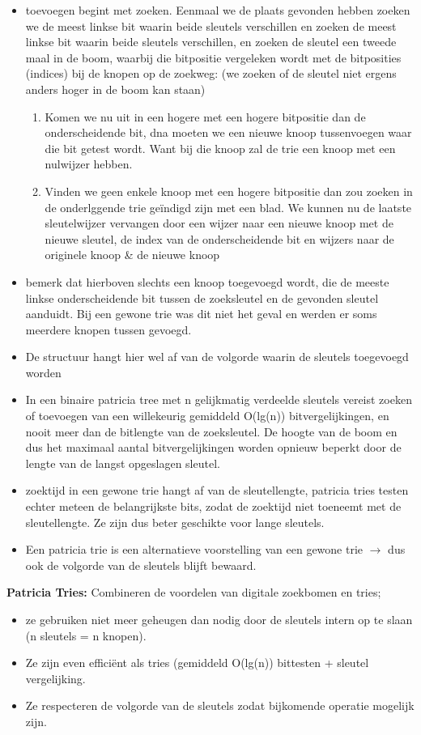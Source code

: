 \begin{itemize}
\item toevoegen begint met zoeken. Eenmaal we de plaats gevonden hebben zoeken we de meest linkse bit waarin beide sleutels verschillen en zoeken de meest linkse bit waarin beide sleutels verschillen, en zoeken de sleutel een tweede maal in de boom, waarbij die bitpositie vergeleken wordt met de bitposities (indices) bij de knopen op de zoekweg: (we zoeken of de sleutel niet ergens anders hoger in de boom kan staan)
\begin{enumerate}
\item Komen we nu uit in een hogere met een hogere bitpositie dan de onderscheidende bit, dna moeten we een nieuwe knoop tussenvoegen waar die bit getest wordt.  Want bij die knoop zal de trie een knoop met een nulwijzer hebben.
\item Vinden we geen enkele knoop met een hogere bitpositie dan zou zoeken in de onderlggende trie ge\"indigd zijn met een blad. We kunnen nu de laatste sleutelwijzer vervangen door een wijzer  naar een nieuwe knoop met de nieuwe sleutel, de index van de onderscheidende bit en wijzers naar de originele knoop \& de nieuwe knoop
\end{enumerate}
\item bemerk dat hierboven slechts een knoop toegevoegd wordt, die de meeste linkse onderscheidende bit tussen de zoeksleutel en de gevonden sleutel aanduidt. Bij een gewone trie was dit niet het geval en werden er soms meerdere knopen tussen gevoegd.
\item De structuur hangt hier wel af van de volgorde waarin de sleutels toegevoegd worden
\item In een binaire patricia tree met n gelijkmatig verdeelde sleutels vereist zoeken of toevoegen van een willekeurig gemiddeld O(lg(n)) bitvergelijkingen, en nooit meer dan de bitlengte van de zoeksleutel. De hoogte van de boom en dus het maximaal aantal bitvergelijkingen worden opnieuw beperkt door de lengte van de langst opgeslagen sleutel.
\item zoektijd in een gewone trie hangt af van de sleutellengte, patricia tries testen echter meteen de belangrijkste bits, zodat de zoektijd niet toeneemt met de sleutellengte. Ze zijn dus beter geschikte voor lange sleutels.
\item Een patricia trie is een alternatieve voorstelling van een gewone trie $\rightarrow$ dus ook de volgorde van de sleutels blijft bewaard.
\end{itemize}

\begin{mdframed}[leftmargin=10pt,rightmargin=10pt]
\textbf{Patricia Tries:} Combineren de voordelen van digitale zoekbomen en tries; 
\begin{itemize}
\item ze gebruiken niet meer geheugen dan nodig door de sleutels intern op te slaan (n sleutels = n knopen). 
\item Ze zijn even effici\"ent als tries (gemiddeld O(lg(n)) bittesten + sleutel vergelijking. 
\item Ze respecteren de volgorde van de sleutels zodat bijkomende operatie mogelijk zijn.
\end{itemize}
\end{mdframed}

